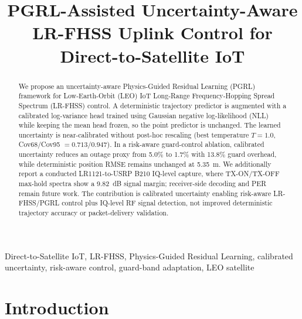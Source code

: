 \documentclass[conference]{IEEEtran}
\begin{document}
\title{PGRL-Assisted Uncertainty-Aware LR-FHSS Uplink Control for Direct-to-Satellite IoT}

\author{
}

\maketitle

\begin{abstract}
We propose an uncertainty-aware Physics-Guided Residual Learning (PGRL) framework for Low-Earth-Orbit (LEO) IoT Long-Range Frequency-Hopping Spread Spectrum (LR-FHSS) control. A deterministic trajectory predictor is augmented with a calibrated log-variance head trained using Gaussian negative log-likelihood (NLL) while keeping the mean head frozen, so the point predictor is unchanged. The learned uncertainty is near-calibrated without post-hoc rescaling (best temperature $T=1.0$, Cov68/Cov95 $=0.713/0.947$). In a risk-aware guard-control ablation, calibrated uncertainty reduces an outage proxy from 5.0\% to 1.7\% with 13.8\% guard overhead, while deterministic position RMSE remains unchanged at 5.35~m. We additionally report a conducted LR1121-to-USRP B210 IQ-level capture, where TX-ON/TX-OFF max-hold spectra show a 9.82~dB signal margin; receiver-side decoding and PER remain future work. The contribution is calibrated uncertainty enabling risk-aware LR-FHSS/PGRL control plus IQ-level RF signal detection, not improved deterministic trajectory accuracy or packet-delivery validation.
\end{abstract}

\begin{IEEEkeywords}
Direct-to-Satellite IoT, LR-FHSS, Physics-Guided Residual Learning, calibrated uncertainty, risk-aware control, guard-band adaptation, LEO satellite
\end{IEEEkeywords}

\section{Introduction}
\label{sec:intro}
\end{document}
